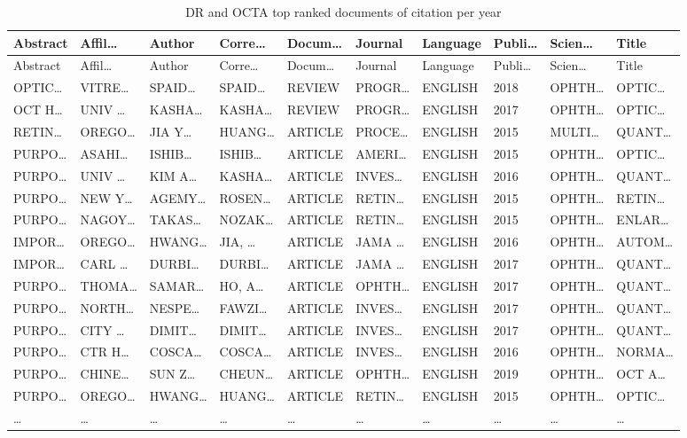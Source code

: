\documentclass[
]{article}
\begin{document}
\begin{longtable}[]{@{}llllllllll@{}}
\caption{\label{tab:DR-and-OCTA-top-ranked-documents-of-citation-per-year}DR and OCTA top ranked documents of citation per year}\tabularnewline
\toprule
Abstract & Affil\ldots{} & Author & Corre\ldots{} & Docum\ldots{} & Journal & Language & Publi\ldots{} & Scien\ldots{} & Title\tabularnewline
\midrule
\endfirsthead
\toprule
Abstract & Affil\ldots{} & Author & Corre\ldots{} & Docum\ldots{} & Journal & Language & Publi\ldots{} & Scien\ldots{} & Title\tabularnewline
\midrule
\endhead
OPTIC\ldots{} & VITRE\ldots{} & SPAID\ldots{} & SPAID\ldots{} & REVIEW & PROGR\ldots{} & ENGLISH & 2018 & OPHTH\ldots{} & OPTIC\ldots{}\tabularnewline
OCT H\ldots{} & UNIV \ldots{} & KASHA\ldots{} & KASHA\ldots{} & REVIEW & PROGR\ldots{} & ENGLISH & 2017 & OPHTH\ldots{} & OPTIC\ldots{}\tabularnewline
RETIN\ldots{} & OREGO\ldots{} & JIA Y\ldots{} & HUANG\ldots{} & ARTICLE & PROCE\ldots{} & ENGLISH & 2015 & MULTI\ldots{} & QUANT\ldots{}\tabularnewline
PURPO\ldots{} & ASAHI\ldots{} & ISHIB\ldots{} & ISHIB\ldots{} & ARTICLE & AMERI\ldots{} & ENGLISH & 2015 & OPHTH\ldots{} & OPTIC\ldots{}\tabularnewline
PURPO\ldots{} & UNIV \ldots{} & KIM A\ldots{} & KASHA\ldots{} & ARTICLE & INVES\ldots{} & ENGLISH & 2016 & OPHTH\ldots{} & QUANT\ldots{}\tabularnewline
PURPO\ldots{} & NEW Y\ldots{} & AGEMY\ldots{} & ROSEN\ldots{} & ARTICLE & RETIN\ldots{} & ENGLISH & 2015 & OPHTH\ldots{} & RETIN\ldots{}\tabularnewline
PURPO\ldots{} & NAGOY\ldots{} & TAKAS\ldots{} & NOZAK\ldots{} & ARTICLE & RETIN\ldots{} & ENGLISH & 2015 & OPHTH\ldots{} & ENLAR\ldots{}\tabularnewline
IMPOR\ldots{} & OREGO\ldots{} & HWANG\ldots{} & JIA, \ldots{} & ARTICLE & JAMA \ldots{} & ENGLISH & 2016 & OPHTH\ldots{} & AUTOM\ldots{}\tabularnewline
IMPOR\ldots{} & CARL \ldots{} & DURBI\ldots{} & DURBI\ldots{} & ARTICLE & JAMA \ldots{} & ENGLISH & 2017 & OPHTH\ldots{} & QUANT\ldots{}\tabularnewline
PURPO\ldots{} & THOMA\ldots{} & SAMAR\ldots{} & HO, A\ldots{} & ARTICLE & OPHTH\ldots{} & ENGLISH & 2017 & OPHTH\ldots{} & QUANT\ldots{}\tabularnewline
PURPO\ldots{} & NORTH\ldots{} & NESPE\ldots{} & FAWZI\ldots{} & ARTICLE & INVES\ldots{} & ENGLISH & 2017 & OPHTH\ldots{} & QUANT\ldots{}\tabularnewline
PURPO\ldots{} & CITY \ldots{} & DIMIT\ldots{} & DIMIT\ldots{} & ARTICLE & INVES\ldots{} & ENGLISH & 2017 & OPHTH\ldots{} & QUANT\ldots{}\tabularnewline
PURPO\ldots{} & CTR H\ldots{} & COSCA\ldots{} & COSCA\ldots{} & ARTICLE & INVES\ldots{} & ENGLISH & 2016 & OPHTH\ldots{} & NORMA\ldots{}\tabularnewline
PURPO\ldots{} & CHINE\ldots{} & SUN Z\ldots{} & CHEUN\ldots{} & ARTICLE & OPHTH\ldots{} & ENGLISH & 2019 & OPHTH\ldots{} & OCT A\ldots{}\tabularnewline
PURPO\ldots{} & OREGO\ldots{} & HWANG\ldots{} & HUANG\ldots{} & ARTICLE & RETIN\ldots{} & ENGLISH & 2015 & OPHTH\ldots{} & OPTIC\ldots{}\tabularnewline
\ldots{} & \ldots{} & \ldots{} & \ldots{} & \ldots{} & \ldots{} & \ldots{} & \ldots{} & \ldots{} & \ldots{}\tabularnewline
\bottomrule
\end{longtable}
\end{document}
